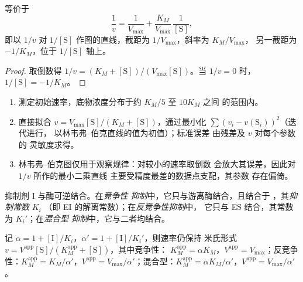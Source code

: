 \begin{proposition}\label{prop:b3:complex-kinetics:lineweaver}
等价于
\[
  \frac1v = \frac{1}{V_{\max}} + \frac{K_M}{V_{\max}}\,\frac{1}{[\mathrm S]},
\]
即以 $1/v$ 对 $1/[\mathrm S]$ 作图的直线，截距为 $1/V_{\max}$，斜率为 $K_M/V_{\max}$，
另一截距为 $-1/K_M$，位于 $1/[\mathrm S]$ 轴上。
\end{proposition}

\begin{proof}
取倒数得 $1/v = (K_M + [\mathrm S])/(V_{\max}[\mathrm S])$。当 $1/v = 0$ 时，$1/[\mathrm S] = -1/K_M$。
\end{proof}

\begin{method}\label{met:b3:complex-kinetics:mm-fit}
\begin{enumerate}
  \item 测定初始速率，底物浓度分布于约 $K_M/5$ 至 $10K_M$ 之间
        的范围内。
  \item 直接拟合 $v = V_{\max}[\mathrm S]/(K_M + [\mathrm S])$，通过最小化 $\sum(v_i - v(\mathrm S_i))^2$（迭代进行，
        以林韦弗–伯克直线的值为初值）；标准误差
        由残差及 $v$ 对每个参数的
        灵敏度求得。
  \item 林韦弗–伯克图仅用于观察规律：对较小的速率取倒数
        会放大其误差，因此对 $1/v$ 所作的最小二乘直线
        主要受精度最差的数据点支配，其参数
        存在偏倚。
\end{enumerate}
\end{method}

\begin{definition}[抑制]\label{def:b3:complex-kinetics:inhibition}
抑制剂 I 与酶可逆结合。在\emph{竞争性
抑制}中，它只与游离酶结合，且结合于
，其\emph{抑制常数} $K_i$
（即 EI 的解离常数）；在\emph{反竞争性抑制}中，
它只与 ES 结合，其常数为 $K_i'$；在\emph{混合型
抑制}中，它与二者均结合。
\end{definition}

\begin{proposition}[抑制作用下的速率规律]\label{prop:b3:complex-kinetics:inhibition-laws}
记 $\alpha = 1 + [\mathrm I]/K_i$，$\alpha' = 1 + [\mathrm I]/K_i'$，则速率仍保持
米氏形式 $v = V^{\mathrm{app}}[\mathrm S]/(K_M^{\mathrm{app}} + [\mathrm S])$，其中竞争性：
$K_M^{\mathrm{app}} = \alpha K_M$，$V^{\mathrm{app}} = V_{\max}$；反竞争性：$K_M^{\mathrm{app}} = K_M/\alpha'$，$V^{\mathrm{app}} =
V_{\max}/\alpha'$；混合型：$K_M^{\mathrm{app}} = \alpha K_M/\alpha'$，$V^{\mathrm{app}} = V_{\max}/\alpha'$。
\end{proposition}

